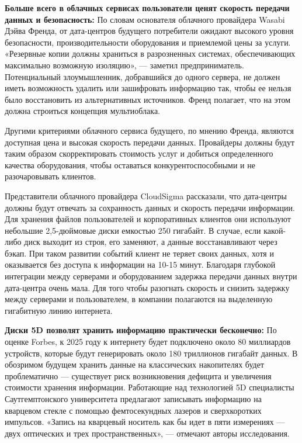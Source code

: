 \textbf{Больше всего в облачных сервисах пользователи ценят скорость передачи данных и безопасность:} По словам основателя облачного провайдера Wasabi Дэйва Френда, от дата-центров будущего потребители ожидают высокого уровня безопасности, производительности оборудования и приемлемой цены за услуги. «Резервные копии должны храниться в разрозненных системах, обеспечивающих максимально возможную изоляцию», --- заметил предприниматель. Потенциальный злоумышленник, добравшийся до одного сервера, не должен иметь возможность удалить или зашифровать информацию так, чтобы ее нельзя было восстановить из альтернативных источников. Френд полагает, что на этом должна строиться концепция мультиоблака.

Другими критериями облачного сервиса будущего, по мнению Френда, являются доступная цена и высокая скорость передачи данных. Провайдеры должны будут таким образом скорректировать стоимость услуг и добиться определенного качества оборудования, чтобы оставаться конкурентоспособными и не разочаровывать клиентов.

Представители облачного провайдера CloudSigma рассказали, что дата-центры должны будут отвечать за сохранность данных и скорость передачи информации. Для хранения файлов пользователей и корпоративных клиентов они используют небольшие 2,5-дюймовые диски емкостью 250 гигабайт. В случае, если какой-либо диск выходит из строя, его заменяют, а данные восстанавливают через бэкап. При таком развитии событий клиент не теряет своих данных, хотя и оказывается без доступа к информации на 10-15 минут. Благодаря глубокой интеграции между серверами и оборудованием задержка передачи данных внутри дата-центра очень мала. Для того чтобы разогнать скорость и снизить задержку между серверами и пользователем, в компании полагаются на выделенную гигабитную линию интернета.


\textbf{Диски 5D позволят хранить информацию практически бесконечно:}
По оценке Forbes, к 2025 году к интернету будет подключено около 80 миллиардов устройств, которые будут генерировать около 180 триллионов гигабайт данных. В обозримом будущем хранить данные на классических накопителях будет проблематично --- существует риск возникновения дефицита и увеличения стоимости хранения информации. Работающие над технологией 5D специалисты Саутгемптонского университета предлагают записывать информацию на кварцевом стекле с помощью фемтосекундных лазеров и сверхкоротких импульсов. «Запись на кварцевый носитель как бы идет в пяти измерениях --- двух оптических и трех пространственных», --- отмечают авторы исследования.


